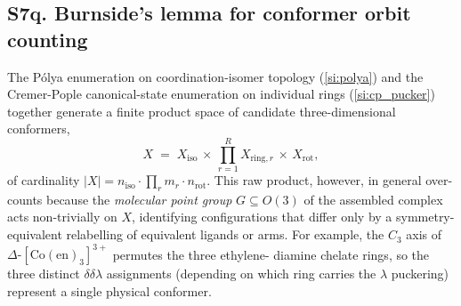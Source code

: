 %
%

\subsection{S7q. Burnside's lemma for conformer orbit counting}
\label{si:burnside_conformer}

The Pólya enumeration on coordination-isomer topology
(\cref{si:polya}) and the Cremer-Pople canonical-state enumeration
on individual rings (\cref{si:cp_pucker}) together generate a
finite product space of candidate three-dimensional conformers,
\begin{equation}
  X \;=\; X_{\mathrm{iso}}
  \,\times\, \prod_{r=1}^{R} X_{\mathrm{ring}, r}
  \,\times\, X_{\mathrm{rot}},
  \label{eq:product_space}
\end{equation}
of cardinality
$\lvert X \rvert = n_{\mathrm{iso}} \cdot \prod_r m_r \cdot n_{\mathrm{rot}}$.
This raw product, however, in general over-counts because the
\emph{molecular point group} $G\subseteq O(3)$ of the assembled
complex acts non-trivially on $X$, identifying configurations that
differ only by a symmetry-equivalent relabelling of equivalent
ligands or arms.  For example, the $C_3$ axis of
$\Delta\text{-}[\mathrm{Co(en)}_3]^{3+}$ permutes the three ethylene-
diamine chelate rings, so the three distinct $\delta\delta\lambda$
assignments (depending on which ring carries the $\lambda$
puckering) represent a single physical conformer.


